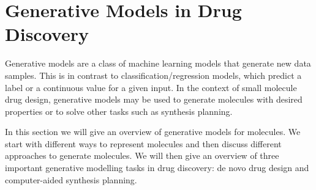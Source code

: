 


\section{Generative Models in Drug Discovery\label{sec:generative-models}}
Generative models are a class of machine learning models that 
generate new data samples. This is in contrast to classification/regression models,
which predict a label or a continuous value for a given input. 
In the context of small molecule drug design, generative models may be 
used to generate molecules with desired properties or to solve 
other tasks such as synthesis planning. 

In this section we will give an overview of generative models for molecules.
We start with different ways to represent molecules and then discuss 
different approaches to generate molecules. We will then give an overview 
of three important generative modelling tasks in drug discovery:
de novo drug design and computer-aided synthesis planning.


